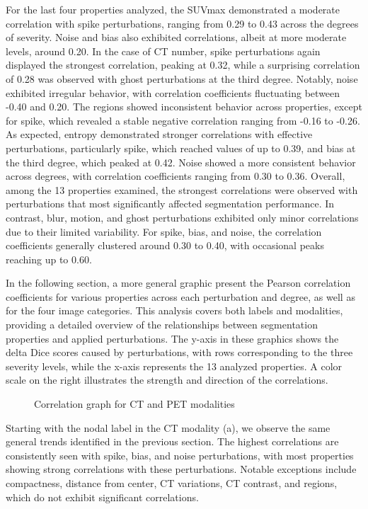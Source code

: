 For the last four properties analyzed, the SUVmax demonstrated a moderate correlation with spike perturbations, ranging from 0.29 to 0.43 across the degrees of severity. Noise and bias also exhibited correlations, albeit at more moderate levels, around 0.20. In the case of CT number, spike perturbations again displayed the strongest correlation, peaking at 0.32, while a surprising correlation of 0.28 was observed with ghost perturbations at the third degree. Notably, noise exhibited irregular behavior, with correlation coefficients fluctuating between -0.40 and 0.20.
The regions showed inconsistent behavior across properties, except for spike, which revealed a stable negative correlation ranging from -0.16 to -0.26. As expected, entropy demonstrated stronger correlations with effective perturbations, particularly spike, which reached values of up to 0.39, and bias at the third degree, which peaked at 0.42. Noise showed a more consistent behavior across degrees, with correlation coefficients ranging from 0.30 to 0.36.
Overall, among the 13 properties examined, the strongest correlations were observed with perturbations that most significantly affected segmentation performance. In contrast, blur, motion, and ghost perturbations exhibited only minor correlations due to their limited variability. For spike, bias, and noise, the correlation coefficients generally clustered around 0.30 to 0.40, with occasional peaks reaching up to 0.60.

\newpage

In the following section, a more general graphic present the Pearson correlation coefficients for various properties across each perturbation and degree, 
as well as for the four image categories. This analysis covers both labels and modalities, providing a detailed overview of the relationships between segmentation 
properties and applied perturbations. The y-axis in these graphics shows the delta Dice scores caused by perturbations, with rows corresponding to the three severity levels,
 while the x-axis represents the 13 analyzed properties. A color scale on the right illustrates the strength and direction of the correlations.
\begin{figure}[ht]
    \centering
    \hfill
    \hfill
    \vfill
    \hfill
    \hfill
    \caption{Correlation graph for CT and PET modalities}
    \label{fig:four_subfigures}
\end{figure}
\newpage
Starting with the nodal label in the CT modality (a), we observe the same general trends identified in the previous section. The highest correlations are consistently seen with spike, bias, and noise perturbations, with most properties showing strong correlations with these perturbations. Notable exceptions include compactness, distance from center, CT variations, CT contrast, and regions, which do not exhibit significant correlations.

